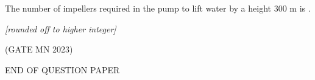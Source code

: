 \documentclass[journal]{IEEEtran}
\begin{document}
\begin{enumerate}
The number of impellers required in the pump to lift water by a height 300 m is \underline{\hspace{2cm}}.  

\textit{[rounded off to higher integer]}  



\hfill(GATE MN 2023)

\end{enumerate}
\begin{center}
	\huge{END OF QUESTION PAPER}
\end{center}
\end{document}

